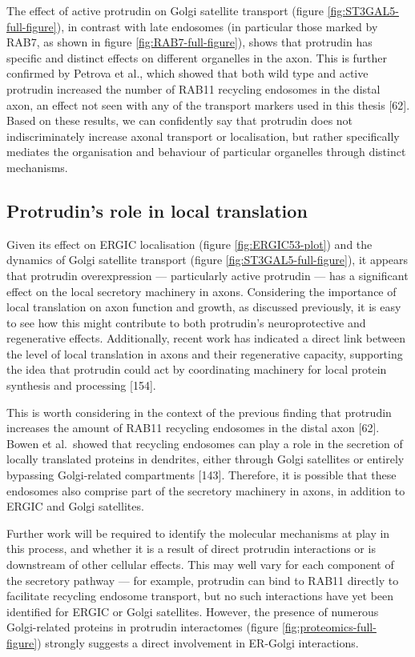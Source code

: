 \documentclass[
  12pt,
  a4paper,
]{book}
\begin{document}
The effect of active protrudin on Golgi satellite transport (figure \ref{fig:ST3GAL5-full-figure}), in contrast with late endosomes (in particular those marked by RAB7, as shown in figure \ref{fig:RAB7-full-figure}), shows that protrudin has specific and distinct effects on different organelles in the axon. This is further confirmed by Petrova et al., which showed that both wild type and active protrudin increased the number of RAB11 recycling endosomes in the distal axon, an effect not seen with any of the transport markers used in this thesis {[}62{]}. Based on these results, we can confidently say that protrudin does not indiscriminately increase axonal transport or localisation, but rather specifically mediates the organisation and behaviour of particular organelles through distinct mechanisms.

\subsection{Protrudin's role in local translation}\label{protrudins-role-in-local-translation}

Given its effect on ERGIC localisation (figure \ref{fig:ERGIC53-plot}) and the dynamics of Golgi satellite transport (figure \ref{fig:ST3GAL5-full-figure}), it appears that protrudin overexpression --- particularly active protrudin --- has a significant effect on the local secretory machinery in axons. Considering the importance of local translation on axon function and growth, as discussed previously, it is easy to see how this might contribute to both protrudin's neuroprotective and regenerative effects. Additionally, recent work has indicated a direct link between the level of local translation in axons and their regenerative capacity, supporting the idea that protrudin could act by coordinating machinery for local protein synthesis and processing {[}154{]}.

This is worth considering in the context of the previous finding that protrudin increases the amount of RAB11 recycling endosomes in the distal axon {[}62{]}. Bowen et al.~showed that recycling endosomes can play a role in the secretion of locally translated proteins in dendrites, either through Golgi satellites or entirely bypassing Golgi-related compartments {[}143{]}. Therefore, it is possible that these endosomes also comprise part of the secretory machinery in axons, in addition to ERGIC and Golgi satellites.

Further work will be required to identify the molecular mechanisms at play in this process, and whether it is a result of direct protrudin interactions or is downstream of other cellular effects. This may well vary for each component of the secretory pathway --- for example, protrudin can bind to RAB11 directly to facilitate recycling endosome transport, but no such interactions have yet been identified for ERGIC or Golgi satellites. However, the presence of numerous Golgi-related proteins in protrudin interactomes (figure \ref{fig:proteomics-full-figure}) strongly suggests a direct involvement in ER-Golgi interactions.
\end{document}
